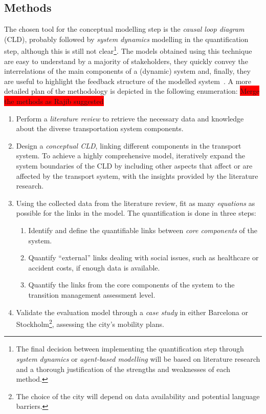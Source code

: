 \documentclass[a4paper,fontsize=10pt,bibliography=totoc]{scrartcl}
\begin{document}
\begin{multicols}{2}
\subsection*{Methods}
The chosen tool for the conceptual modelling step is the \textit{causal loop diagram} (CLD), probably followed by \textit{system dynamics} modelling in the quantification step, although this is still not clear\footnote{The final decision between implementing the quantification step through \textit{system dynamics} or \textit{agent-based modelling} will be based on literature research and a thorough justification of the strengths and weaknesses of each method.}. The models obtained using this technique are easy to understand by a majority of stakeholders, they quickly convey the interrelations of the main components of a (dynamic) system and, finally, they are useful to highlight the feedback structure of the modelled system~\parencite{ghosh2015_DynamicSystemsEveryone}. A more detailed plan of the methodology is depicted in the following enumeration:
%
\colorbox{red}{Merge the methods as Rajib suggested}
\begin{enumerate}[label=(\alph*)]
	\item Perform a \textit{literature review} to retrieve the necessary data and knowledge about the diverse transportation system components.
	\item Design a \textit{conceptual CLD}, linking different components in the transport system. To achieve a highly comprehensive model, iteratively expand the system boundaries of the CLD by including other aspects that affect or are affected by the transport system, with the insights provided by the literature research.
	\item Using the collected data from the literature review, fit as many \textit{equations} as possible for the links in the model. The quantification is done in three steps:
	\begin{enumerate}[label=\roman*.]
		\item Identify and define the quantifiable links between \textit{core components} of the system.
		\item Quantify ``external'' links dealing with social issues, such as healthcare or accident costs, if enough data is available.
		\item Quantify the links from the core components of the system to the transition management assessment level.
	\end{enumerate}
	\item Validate the evaluation model through a \textit{case study} in either Barcelona or Stockholm\footnote{The choice of the city will depend on data availability and potential language barriers.}, assessing the city's mobility plans.
\end{enumerate}


\end{multicols}
\end{document}
